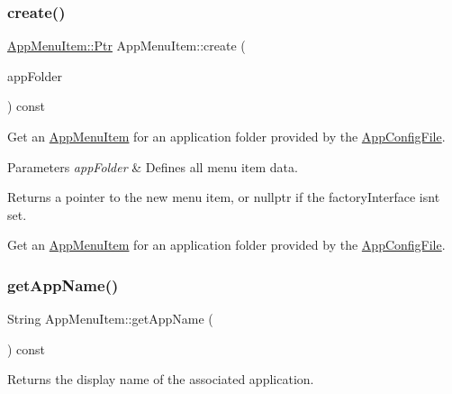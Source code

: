 \subsubsection{\texorpdfstring{create()}{create()}\hspace{0.1cm}{\footnotesize\ttfamily [3/3]}}
{\footnotesize\ttfamily \mbox{\hyperlink{classAppMenuItem_ab5f51c5d74f8df62b8862c0cc8126cb7}{App\+Menu\+Item\+::\+Ptr}} App\+Menu\+Item\+::create (\begin{DoxyParamCaption}\item[{const \mbox{\hyperlink{structAppConfigFile_1_1AppFolder}{App\+Config\+File\+::\+App\+Folder}} \&}]{app\+Folder }\end{DoxyParamCaption}) const\hspace{0.3cm}{\ttfamily [protected]}}

Get an \mbox{\hyperlink{classAppMenuItem}{App\+Menu\+Item}} for an application folder provided by the \mbox{\hyperlink{classAppConfigFile}{App\+Config\+File}}.


\begin{DoxyParams}{Parameters}
{\em app\+Folder} & Defines all menu item data.\\
\hline
\end{DoxyParams}
\begin{DoxyReturn}{Returns}
a pointer to the new menu item, or nullptr if the factory\+Interface isn\textquotesingle{}t set.
\end{DoxyReturn}
Get an \mbox{\hyperlink{classAppMenuItem}{App\+Menu\+Item}} for an application folder provided by the \mbox{\hyperlink{classAppConfigFile}{App\+Config\+File}}. \mbox{\label{classAppMenuItem_aef18401da6511ac234ccbb2d2131fcad}} 
\subsubsection{\texorpdfstring{get\+App\+Name()}{getAppName()}}
{\footnotesize\ttfamily String App\+Menu\+Item\+::get\+App\+Name (\begin{DoxyParamCaption}{ }\end{DoxyParamCaption}) const\hspace{0.3cm}{\ttfamily [virtual]}}

\begin{DoxyReturn}{Returns}
the display name of the associated application. 
\end{DoxyReturn}


